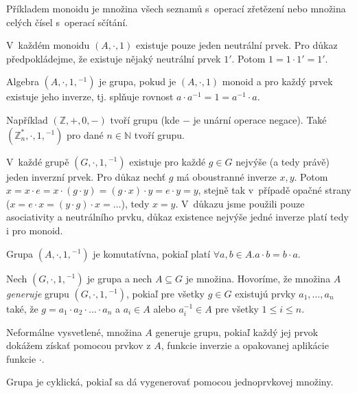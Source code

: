 Příkladem monoidu je množina všech seznamů s~operací zřetězení nebo
množina celých čísel s~operací sčítání.

V~každém monoidu $(A, \cdot, 1)$ existuje pouze jeden neutrální
prvek. Pro důkaz předpokládejme, že existuje nějaký neutrální prvek $1'$.
Potom $1 = 1 \cdot 1' = 1'$.

\begin{definition}[Grupa]
    Algebra $(A, \cdot, 1, {^{-1}})$ je grupa, pokud
    je $(A, \cdot, 1)$ monoid a pro každý prvek existuje jeho 
	inverze, tj. splňuje rovnost $a \cdot a^{-1} = 1 = a^{-1} \cdot a$.
\end{definition}

Například $(\mathbb{Z}, +, 0, -)$ tvoří grupu (kde $-$ je unární operace negace).
Také $(\mathbb{Z}^*_n, \cdot, 1, {^{-1}})$ pro dané $n \in \mathbb{N}$ tvoří grupu.

V~každé grupě $(G, \cdot, 1, {^{-1}})$ existuje pro každé $g \in G$ nejvýše
(a tedy právě) jeden inverzní prvek.
Pro důkaz nechť $g$ má oboustranné inverze $x,y$.
Potom $x = x \cdot e = x \cdot (g \cdot y) = (g \cdot x) \cdot y
= e \cdot y = y$, stejně tak v~případě opačné strany
($x = e \cdot x = (y \cdot g) \cdot x =\ldots$),
tedy $x = y$. V~důkazu jsme použili pouze asociativity a neutrálního
prvku, důkaz existence nejvýše jedné inverze platí tedy i pro monoid.

\begin{definition}
    Grupa $(A, \cdot, 1, {^{-1}})$ je komutatívna, pokiaľ platí
	$\forall a,b \in A.a\cdot b = b \cdot a$.
\end{definition}

\begin{definition}
    Nech $(G, \cdot, 1, {^{-1}})$ je grupa a nech $A \subseteq G$ je množina.
	Hovoríme, že množina $A$ {\em generuje} grupu $(G, \cdot, 1, {^{-1}})$,
	pokiaľ pre všetky $g \in G$ existujú prvky $a_1, \ldots, a_n$ také, 
	že $g=a_1 \cdot a_2 \cdot \ldots \cdot a_n$ a
	$a_i \in A$ alebo $a_i^{-1} \in A$ pre všetky $1 \leq i \leq n$. 
\end{definition}

Neformálne vysvetlené, množina $A$ generuje grupu, pokiaľ každý
jej prvok dokážem získať pomocou prvkov z $A$, funkcie inverzie a opakovanej
aplikácie funkcie $\cdot$.

\begin{definition}
    Grupa je cyklická, pokiaľ sa dá vygenerovať pomocou jednoprvkovej množiny.
\end{definition}

